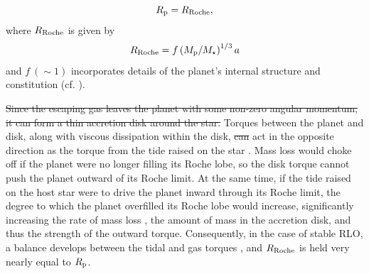 \documentclass{svjour3}                     %
\providecommand{\DIFadd}[1]{{\protect\color{blue}\uwave{#1}}} %
\providecommand{\DIFdel}[1]{{\protect\color{red}\sout{#1}}}                      %
\providecommand{\DIFaddbegin}{} %
\providecommand{\DIFaddend}{} %
\providecommand{\DIFdelbegin}{} %
\providecommand{\DIFdelend}{} %
\begin{document}
\begin{equation}
R_{\rm p} = R_{\rm Roche},
\label{eqn:Rp_RRoche_equality}
\end{equation}
where $R_{\rm Roche}$ is given by 
\begin{equation}
R_{\rm Roche} = f \left( M_{\rm p}/M_{\star} \right)^{1/3} a
\label{eqn:RRoche}
\end{equation}
and $f\ (\sim 1)$ incorporates details of the planet's internal structure and constitution (cf. \cite{MurrayDermott1999}). 

\DIFdelbegin \DIFdel{Since the escaping gas leaves the planet with some non-zero angular momentum, it can form a thin accretion disk around the star. }\DIFdelend Torques between the planet and disk, along with viscous dissipation within the disk, \DIFdelbegin \DIFdel{can }\DIFdelend act in the opposite direction as the torque from the tide raised on the star \DIFaddbegin \DIFadd{\mbox{%
\cite{1979MNRAS.186..799L}}%
}\DIFaddend . Mass loss would choke off if the planet were no longer filling its Roche lobe, so the disk torque cannot push the planet outward of its Roche limit. At the same time, if the tide raised on the host star were to drive the planet inward through its Roche limit, the degree to which the planet overfilled its Roche lobe would increase, significantly increasing the rate of mass loss \cite{Ritter1988Turning}, the amount of mass in the accretion disk, and thus the strength of the outward torque. Consequently, in the case of stable RLO, a balance develops between the tidal and gas torques \cite{Priedhorsky1988Tidal}, and $R_{\rm Roche}$ is held very nearly equal to $R_{\rm p}$. 
\end{document}
